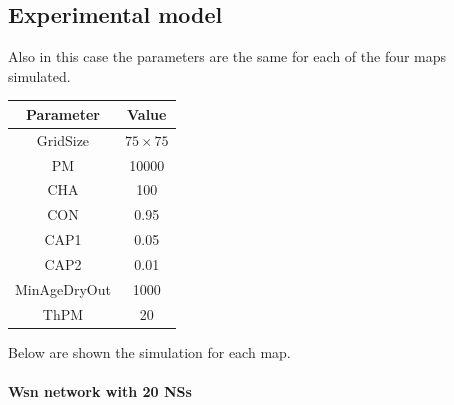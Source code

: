 \subsection{Experimental model}

Also in this case the parameters are the same for each of the four maps simulated.

\begin{center}
 \begin{tabular}{||c c||} 
 \hline
 Parameter & Value \\ [0.5ex] 
 \hline\hline
 GridSize & $75 \times 75$ \\ 
 \hline
 PM & 10000 \\ 
 \hline
 CHA & 100 \\ 
 \hline
 CON & 0.95 \\ 
 \hline
 CAP1 & 0.05 \\ 
 \hline
 CAP2 & 0.01 \\ 
 \hline
 MinAgeDryOut & 1000 \\
 \hline
 ThPM & 20 \\ [1ex] 
 \hline
 \end{tabular}
\end{center}

Below are shown the simulation for each map. 

\paragraph{Wsn network with 20 NSs}

